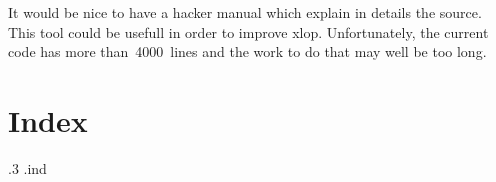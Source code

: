 \documentclass[12pt]{report}
\newcommand\package[1]{\textsf{#1}}
\begin{document}
It would be nice to have a hacker manual which explain in details the
source. This tool could be usefull in order to improve
\package{xlop}. Unfortunately, the current code has more
than~4000~lines and the work to do that may well be too long.

\chapter{Index}
\label{chap:index}
\begin{multicols}{2}
\makeatletter
\parindent \z@\relax
\parskip \z@ \@plus.3\p@\relax
\let\item\@idxitem
\makeatother
\renewenvironment{theindex}{}{}%
\jobname.ind
\end{multicols}
\end{document}
